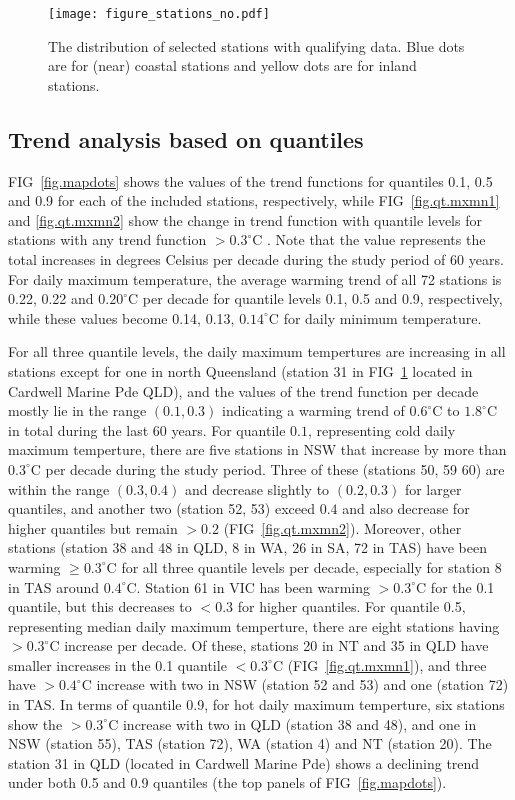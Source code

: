 \documentclass[fleqn,10pt]{wlscirep}
\newcommand{\dc}[1]{#1^{ \circ}\mathrm{C}}
\begin{document}
\begin{figure}[H]
	\centering
	\texttt{[image: figure\_stations\_no.pdf]}
	\caption{The distribution of selected stations with qualifying data. Blue dots are for (near) coastal stations and yellow dots are for inland stations.}
	\label{fig.distribution}
\end{figure}




\subsection*{Trend analysis based on quantiles}
FIG~\ref{fig.mapdots} shows the values of the trend functions for quantiles 0.1, 0.5 and 0.9 for each of the included stations, respectively, while FIG~\ref{fig.qt.mxmn1} and \ref{fig.qt.mxmn2} show the change in trend function with quantile levels for stations with any trend function $>\dc{0.3}$ . Note that the value represents the total increases in degrees Celsius per decade during the study period of 60 years. {For daily maximum temperature, the average warming trend of all 72 stations is 0.22, 0.22 and $\dc{0.20}$ per decade for quantile levels 0.1, 0.5 and 0.9, respectively, while these values become 0.14, 0.13, $\dc{0.14}$ for daily minimum temperature.}

For all three quantile levels, the daily maximum tempertures are increasing in all stations except for one in north Queensland (station 31 in FIG~\ref{fig.distribution} located in Cardwell Marine Pde QLD), and the values of the trend function per decade mostly lie in the range $(0.1,0.3)$ indicating a warming trend of $\dc{0.6}$ to $\dc{1.8}$ in total during the last 60 years.
For quantile $0.1$, representing cold daily maximum temperture, there are five stations in NSW that increase by more than $\dc{0.3}$ per decade during the study period.
Three of these (stations 50, 59 60) are within the range $(0.3,0.4)$ and decrease slightly to $(0.2,0.3)$ for larger quantiles, and another two (station 52, 53) exceed $0.4$ and also decrease for higher quantiles but remain $>0.2$ (FIG~\ref{fig.qt.mxmn2}).  Moreover, other stations (station 38 and 48 in QLD, 8 in WA, 26 in SA, 72 in TAS) have been warming  $\geq\dc{0.3}$ for all three quantile levels per decade, especially for station 8 in TAS around $ \dc{0.4}$. Station 61 in VIC has been warming $>\dc{0.3}$ for the 0.1 quantile, but this decreases to  $<0.3$ for higher quantiles.
For quantile 0.5, representing median daily maximum temperture, there are eight stations having $>\dc{0.3}$ increase per decade. Of these, stations 20 in NT and 35 in QLD have smaller increases in the 0.1 quantile $<\dc{0.3}$ (FIG~\ref{fig.qt.mxmn1}), and three have $>\dc{0.4}$ increase with two in NSW (station 52 and 53) and one (station 72) in TAS.
In terms of quantile 0.9, for hot daily maximum temperture, six stations show the $>\dc{0.3}$ increase with two in QLD (station 38 and 48), and one in NSW (station 55), TAS (station 72), WA (station 4) and NT (station 20). The station 31 in QLD (located in Cardwell Marine Pde) shows a declining trend under both 0.5 and 0.9 quantiles (the top panels of FIG~\ref{fig.mapdots}).
\end{document}
